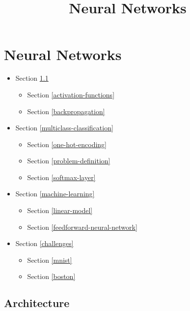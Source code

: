 \documentclass[11pt]{article}
\title{Neural Networks}
\providecommand{\tightlist}{%
      \setlength{\itemsep}{0pt}\setlength{\parskip}{0pt}}
\begin{document}
    
    
    \maketitle
    
    

    
    \section{Neural Networks}\label{neural-networks}

    \begin{itemize}
\tightlist
\item
  Section \ref{architecture}

  \begin{itemize}
  \tightlist
  \item
    Section \ref{activation-functions}
  \item
    Section \ref{backpropagation}
  \end{itemize}
\item
  Section \ref{multiclass-classification}

  \begin{itemize}
  \tightlist
  \item
    Section \ref{one-hot-encoding}
  \item
    Section \ref{problem-definition}
  \item
    Section \ref{softmax-layer}
  \end{itemize}
\item
  Section \ref{machine-learning}

  \begin{itemize}
  \tightlist
  \item
    Section \ref{linear-model}
  \item
    Section \ref{feedforward-neural-network}
  \end{itemize}
\item
  Section \ref{challenges}

  \begin{itemize}
  \tightlist
  \item
    Section \ref{mnist}
  \item
    Section \ref{boston}
  \end{itemize}
\end{itemize}

    \subsection{Architecture }\label{architecture}
\end{document}
